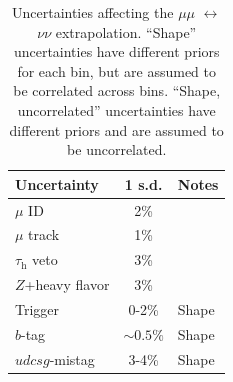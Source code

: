 \begin{table}[]
    \begin{center}
    \caption{Uncertainties affecting the $\mu\mu$ $\leftrightarrow$ $\nu\nu$ extrapolation. ``Shape'' uncertainties have different priors for each bin, but are assumed to be correlated across bins. ``Shape, uncorrelated'' uncertainties have different priors and are assumed to be uncorrelated.}
    \label{tab:mt:zmm_uncs}
    \begin{tabular}{lcl}
        Uncertainty & 1 s.d. & Notes \\ 
        \hline \hline 
        $\mu$ ID  & 2\% & \\ 
        $\mu$ track  & 1\% & \\ 
        $\tau_\mathrm{h}$ veto  & 3\% & \\ 
        $Z$+heavy flavor & 3\% & \\ 
        Trigger & 0-2\% & Shape \\ 
        $b$-tag & $\sim0.5\%$ & Shape \\ 
        $udcsg$-mistag & 3-4\% & Shape \\ 
    \end{tabular}
\end{center}
\end{table}


